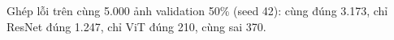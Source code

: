 Ghép lỗi trên cùng 5.000 ảnh validation 50\% (seed 42): cùng đúng 3.173, chỉ ResNet đúng 1.247, chỉ ViT đúng 210, cùng sai 370.
